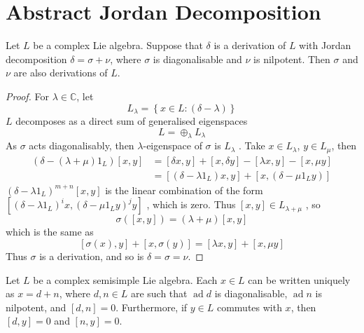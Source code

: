 \documentclass[../main.tex]{subfiles}
\begin{document}
\section{Abstract Jordan Decomposition }

\begin{proposition}{}{}
Let $L$ be a complex Lie algebra. Suppose that $\delta$ is a derivation of $L$ with Jordan decomposition $\delta = \sigma + \nu$, where $\sigma$ is diagonalisable and $\nu$ is nilpotent. Then $\sigma$ and $\nu$ are also derivations of $L$.
\end{proposition}

\begin{proof}
    For \(   \lambda \in \mathbb{C}   \), let \[
    L_{ \lambda }= \left\{ x \in L:\left(  \delta - \lambda  \right)  \right\}
    \] \(  L  \) decomposes as a direct sum of generalised eigenspaces \[
    L= \oplus _{ \lambda }L_{ \lambda }
    \] As \(   \sigma   \) acts diagonalisably, then \(   \lambda   \)-eigenspace of \(   \sigma   \) is   \(  L_{ \lambda }  \)  . Take \(  x \in L_{ \lambda }  \), \(  y\in L_{\mu }  \), then \[
   \begin{aligned}
    \left(  \delta - \left(  \lambda + \mu  \right)   1_{L} \right)[x,y]&= [ \delta x,y]+ [x, \delta y]-  [\lambda x,y]-\left[ x,\mu y \right]  \\ 
     &= [\left(  \delta -  \lambda   1_{L} \right)x,y ]+ [x, \left(  \delta -\mu  1_{L}y \right) ]
   \end{aligned}
    \]\(  \left(  \delta - \lambda  1_{L} \right)^{m+ n}[x,y]   \) is the linear combination of the form \(  [\left(  \delta - \lambda  1_{L} \right)^{i}x, \left(  \delta -\mu  1_{L}y \right)^{j}y ]   \)  , which is zero. Thus \(  \left[ x,y \right]\in L_{ \lambda + \mu }   \) , so \[
     \sigma \left( \left[ x,y \right]  \right)= \left(  \lambda + \mu  \right)\left[ x,y \right]   
    \] which is the same as \[
    \left[  \sigma \left( x \right),y  \right] + \left[ x, \sigma \left( y \right)  \right]= \left[  \lambda x,y \right]+ \left[ x, \mu y \right]   
    \] Thus \(   \sigma   \) is a derivation, and so is  \(   \delta = \sigma = \nu   \).  
\end{proof}

\begin{theorem}{}{}
    Let $L$ be a complex semisimple Lie algebra. Each $x \in L$ can be written uniquely as $x = d+n$, where $d,n \in L$ are such that $\operatorname{ad} d$ is diagonalisable, $\operatorname{ad} n$ is nilpotent, and $[d, n] = 0$. Furthermore, if $y \in L$ commutes with $x$, then $[d, y] = 0$ and $[n, y] = 0$.
\end{theorem}
\end{document}
